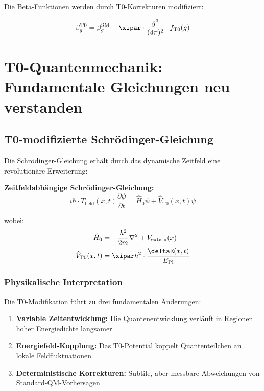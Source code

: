 	Die Beta-Funktionen werden durch T0-Korrekturen modifiziert:
	
	\begin{equation}
		\beta_g^{\text{T0}} = \beta_g^{\text{SM}} + \xipar \cdot \frac{g^3}{(4\pi)^2} \cdot f_{\text{T0}}(g)
	\end{equation}
	
	\section{T0-Quantenmechanik: Fundamentale Gleichungen neu verstanden}
	
	\subsection{T0-modifizierte Schrödinger-Gleichung}
	
	Die Schrödinger-Gleichung erhält durch das dynamische Zeitfeld eine revolutionäre Erweiterung:
	
	\begin{tcolorbox}[colback=cyan!5!white,colframe=cyan!75!black,title=T0-Schrödinger-Gleichung]
		\textbf{Zeitfeldabhängige Schrödinger-Gleichung:}
		\begin{equation}
			i\hbar \cdot T_{\text{field}}(x,t) \frac{\partial\psi}{\partial t} = \hat{H}_0 \psi + \hat{V}_{\text{T0}}(x,t) \psi
		\end{equation}
		
		wobei:
		\begin{align}
			\hat{H}_0 &= -\frac{\hbar^2}{2m} \nabla^2 + V_{\text{extern}}(x) \\
			\hat{V}_{\text{T0}}(x,t) &= \xipar \hbar^2 \cdot \frac{\deltaE(x,t)}{E_{\text{Pl}}}
		\end{align}
	\end{tcolorbox}
	
	\subsubsection{Physikalische Interpretation}
	
	Die T0-Modifikation führt zu drei fundamentalen Änderungen:
	
	\begin{enumerate}
		\item \textbf{Variable Zeitentwicklung:} Die Quantenentwicklung verläuft in Regionen hoher Energiedichte langsamer
		\item \textbf{Energiefeld-Kopplung:} Das T0-Potential koppelt Quantenteilchen an lokale Feldfluktuationen
		\item \textbf{Deterministische Korrekturen:} Subtile, aber messbare Abweichungen von Standard-QM-Vorhersagen
	\end{enumerate}
	
